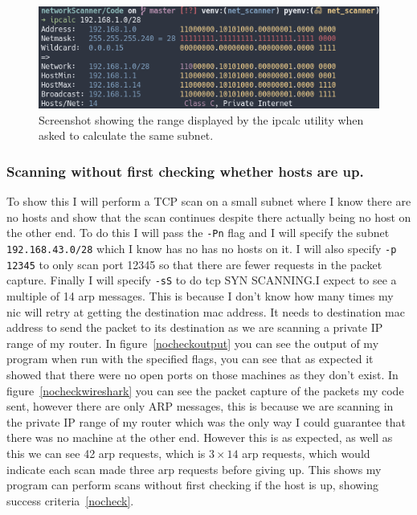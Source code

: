 \documentclass[titlepage]{article}
\let\Oldsubsubsection\subsubsection{}
\renewcommand{\subsubsection}{\FloatBarrier\Oldsubsubsection}
\begin{document}
\begin{figure}[H]
  \centering
  \includegraphics[width=\textwidth]{ipcalclist.png}
  \caption{%
    Screenshot showing the range displayed by the ipcalc utility when asked to calculate
    the same subnet.
  }\label{cidrwebproof}
\end{figure}

\subsubsection{Scanning without first checking whether hosts are up.}
To show this I will perform a TCP scan on a small subnet where I
know there are no hosts and show that the scan continues despite there actually
being no host on the other end. To do this I will pass the \verb|-Pn| flag
and I will specify the subnet \verb|192.168.43.0/28| which I know has no has no hosts
on it. I will also specify \verb|-p 12345| to only scan port 12345 so that there are
fewer requests in the packet capture. Finally I will specify \verb|-sS| to do \gls{tcp}
SYN SCANNING.\@ I expect to see a multiple of 14 \gls{arp} messages.
This is because I don't know how many times my \gls{nic} will retry at getting
the destination \gls{mac} address. It needs to destination \gls{mac} address to send
the packet to its destination as we are scanning a private IP range of my router.
In figure~\ref{nocheckoutput} you can see the output of my program when run with the
specified flags, you can see that as expected it showed that there were no open ports
on those machines as they don't exist. In figure~\ref{nocheckwireshark} you can see the
packet capture of the packets my code sent, however there are only ARP messages, this is
because we are scanning in the private IP range of my router which was the only
way I could guarantee that there was no machine at the other end. However this is
as expected, as well as this we can see 42 \gls{arp} requests, which is $3\times14$
\gls{arp} requests, which would indicate each scan made three \gls{arp} requests before
giving up. This shows my program can perform scans without first checking if the host is
up, showing success criteria~\ref{nocheck}.
\end{document}
